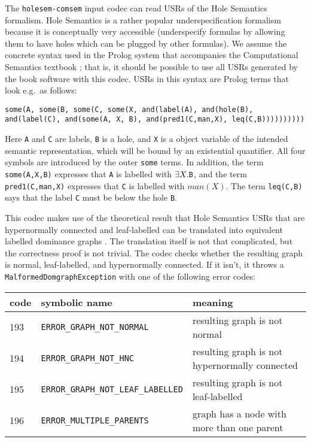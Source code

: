 The \verb?holesem-comsem? input codec can read USRs of the Hole
Semantics formalism. Hole Semantics \cite{Bos96} is a rather popular
underspecification formalism because it is conceptually very
accessible (underspecify formulas by allowing them to have holes which
can be plugged by other formulas). We assume the concrete syntax used
in the Prolog system that accompanies the Computational Semantics
textbook \cite{blackburn05:_repres_infer_natur_languag}; that is, it
should be possible to use all USRs generated by the book software with
this codec. USRs in this syntax are Prolog terms that look e.g.\ as
follows:

\begin{verbatim}
some(A, some(B, some(C, some(X, and(label(A), and(hole(B),
and(label(C), and(some(A, X, B), and(pred1(C,man,X), leq(C,B))))))))))
\end{verbatim}

Here \verb?A? and \verb?C? are labels, \verb?B? is a hole, and
\verb?X? is a object variable of the intended semantic representation,
which will be bound by an existential quantifier. All four symbols are
introduced by the outer \verb?some? terms. In addition, the term
\verb?some(A,X,B)? expresses that \verb?A? is labelled with $\exists
X. \verb?B?$, and the term \verb?pred1(C,man,X)? expresses that
\verb?C? is labelled with $man(X)$. The term \verb?leq(C,B)? says that
the label \verb?C? must be below the hole \verb?B?.

This codec makes use of the theoretical result that Hole Semantics
USRs that are hypernormally connected and leaf-labelled can be
translated into equivalent labelled dominance graphs
\cite{KolNieTha03}. The translation itself is not that complicated,
but the correctness proof is not trivial. The codec checks whether the
resulting graph is normal, leaf-labelled, and hypernormally
connected. If it isn't, it throws a \verb?MalformedDomgraphException?
with one of the following error codes:

\begin{tabular}{lll}
code & symbolic name & meaning \\ \hline
193 &  \verb?ERROR_GRAPH_NOT_NORMAL? & resulting graph is not normal \\
194 &  \verb?ERROR_GRAPH_NOT_HNC? & resulting graph is not hypernormally
connected \\
195 &  \verb?ERROR_GRAPH_NOT_LEAF_LABELLED? & resulting graph is not
leaf-labelled \\
196 &  \verb?ERROR_MULTIPLE_PARENTS? & graph has a node with more than one
parent 
\end{tabular}

